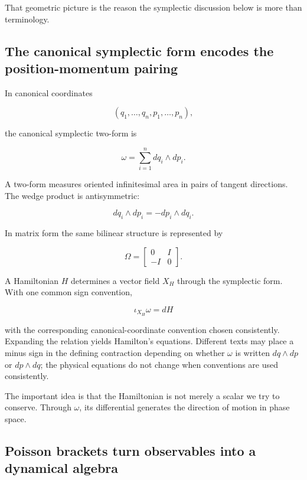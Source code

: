 That geometric picture is the reason the symplectic discussion below is more than terminology.

\subsection{The canonical symplectic form encodes the position-momentum pairing}\label{02-foundations-ii-ch025-the-canonical-symplectic-form-encodes-the-position-momentum-pairing}

In canonical coordinates

\[
(q_1,\ldots,q_n,p_1,\ldots,p_n),
\]

the canonical symplectic two-form is

\[
\boxed{
\omega
=
\sum_{i=1}^{n}
dq_i\wedge dp_i
}.
\]

A two-form measures oriented infinitesimal area in pairs of tangent directions. The wedge product is antisymmetric:

\[
dq_i\wedge dp_i
=
-
dp_i\wedge dq_i.
\]

In matrix form the same bilinear structure is represented by

\[
\Omega
=
\begin{bmatrix}
0&I\\
-I&0
\end{bmatrix}.
\]

A Hamiltonian \(H\) determines a vector field \(X_H\) through the symplectic form. With one common sign convention,

\[
\boxed{
\iota_{X_H}\omega=dH
}
\]

with the corresponding canonical-coordinate convention chosen consistently. Expanding the relation yields Hamilton's equations. Different texts may place a minus sign in the defining contraction depending on whether \(\omega\) is written \(dq\wedge dp\) or \(dp\wedge dq\); the physical equations do not change when conventions are used consistently.

The important idea is that the Hamiltonian is not merely a scalar we try to conserve. Through \(\omega\), its differential generates the direction of motion in phase space.

\subsection{Poisson brackets turn observables into a dynamical algebra}\label{02-foundations-ii-ch025-poisson-brackets-turn-observables-into-a-dynamical-algebra}

